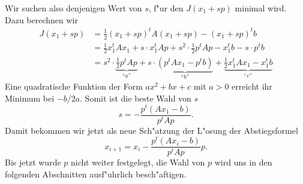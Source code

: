 Wir suchen also denjenigen Wert von $s$, f"ur den $J(x_1+sp)$ minimal
wird. Dazu berechnen wir
\begin{align*}
J(x_1+sp)
&=
\frac12(x_1+sp)^tA(x_1+sp)-(x_1+sp)^tb\\
&=
\frac12 x_1^tAx_1 +s\cdot x_1^tAp +s^2\cdot \frac12 p^tAp-x_1^tb - s\cdot p^t b
\\
&=s^2\cdot \underbrace{\frac12 p^tAp}_{\text{``$a$''}} + s\cdot \underbrace{(p^tAx_1-p^tb)}_{\text{``$b$''}} +\underbrace{\frac12 x_1^tAx_1 -x_1^tb}_{\text{``$c$''}}
\end{align*}
Eine quadratische Funktion der Form $ax^2+bx+c$ mit $a>0$ erreicht ihr
Minimum bei $-b/2a$. Somit ist die beste Wahl von $s$
\[
s=-\frac{p^t(Ax_1-b)}{p^tAp}.
\]
Damit bekommen wir jetzt als neue Sch"atzung der L"osung 
der Abstiegsformel
\begin{equation}
x_{i+1}=x_i-\frac{p^t(Ax_i-b)}{p^tAp} p.
\label{descent:main}
\end{equation}
Bis jetzt wurde $p$ nicht weiter festgelegt, die Wahl von $p$ wird uns
in den folgenden Abschnitten ausf"uhrlich besch"aftigen.

